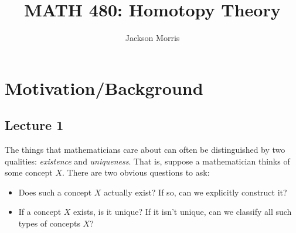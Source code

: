 \documentclass[10pt]{amsart}
\theoremstyle{definition}
\begin{document}
\title{MATH 480: Homotopy Theory}
\author{Jackson Morris}
\address{Department of Mathematics, University of Washington, Seattle, Washington}




\maketitle
\tableofcontents
\newpage

\section{Motivation/Background}
\subsection*{Lecture 1}
\hfill

The things that mathematicians care about can often be distinguished by two qualities: \emph{existence} and \emph{uniqueness}. That is, suppose a mathematician thinks of some concept $X$. There are two obvious questions to ask:
\begin{itemize}
    \item Does such a concept $X$ actually exist? If so, can we explicitly construct it?
    \item If a concept $X$ exists, is it unique? If it isn't unique, can we classify all such types of concepts $X$?
\end{itemize}
\end{document}
